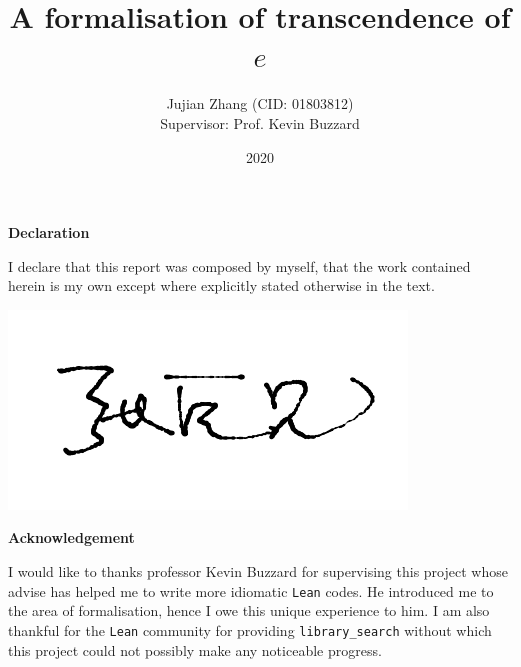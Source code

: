 \documentclass{report}
\title{A formalisation of transcendence of $e$}
\author{Jujian Zhang (CID: 01803812)\\[.5cm]{Supervisor: Prof. Kevin Buzzard}}
\date{2020}
\theoremstyle{definition}
\begin{document}
\maketitle

\clearpage\thispagestyle{empty}\addtocounter{page}{-1}
\begin{center}
  \textbf{Declaration}
\end{center}
I declare that this report was composed by myself, that the work contained herein is my own except where explicitly stated otherwise in the text.

\begin{flushright}
  \includegraphics[height=1.5\baselineskip]{signature.png}
\end{flushright}
\clearpage

\begin{center}
  \textbf{Acknowledgement}
\end{center}
I would like to thanks professor Kevin Buzzard for supervising this project whose advise has helped me to write more idiomatic {\tt \small Lean} codes. He introduced me to the area of formalisation, hence I owe this unique experience to him. I am also thankful for the {\tt\small Lean} community for providing {\tt\small library\_search} without which this project could not possibly make any noticeable progress.
\clearpage
\end{document}
